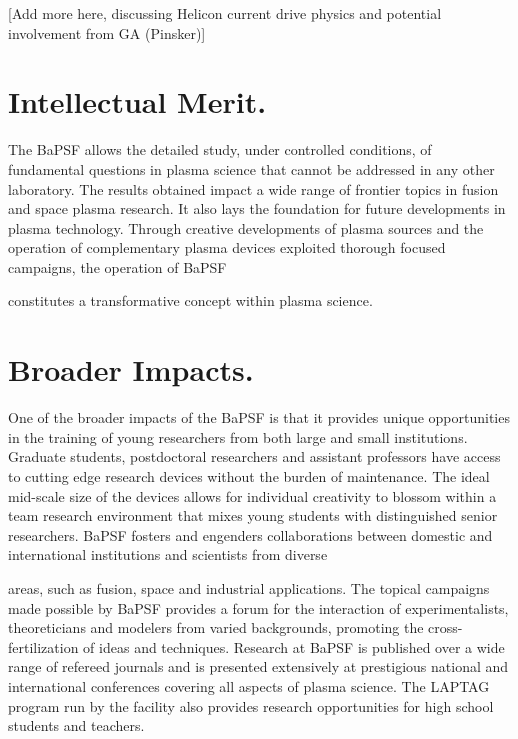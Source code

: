 \documentclass[11pt]{article}
\begin{document}
{[}Add more here, discussing Helicon current drive physics and potential
involvement from GA (Pinsker){]}


\section{Intellectual Merit.}

The BaPSF allows the detailed study, under controlled conditions, of
fundamental questions in plasma science that cannot be addressed in any
other laboratory. The results obtained impact a wide range of frontier
topics in fusion and space plasma research. It also lays the foundation
for future developments in plasma technology. Through creative
developments of plasma sources and the operation of complementary plasma
devices exploited thorough focused campaigns, the operation of BaPSF

constitutes a transformative concept within plasma science.

\section{Broader Impacts.}

One of the broader impacts of the BaPSF is that it provides unique
opportunities in the training of young researchers from both large and
small institutions. Graduate students, postdoctoral researchers and
assistant professors have access to cutting edge research devices
without the burden of maintenance. The ideal mid-scale size of the
devices allows for individual creativity to blossom within a team
research environment that mixes young students with distinguished senior
researchers. BaPSF fosters and engenders collaborations between domestic
and international institutions and scientists from diverse

areas, such as fusion, space and industrial applications. The topical
campaigns made possible by BaPSF provides a forum for the interaction of
experimentalists, theoreticians and modelers from varied backgrounds,
promoting the cross-fertilization of ideas and techniques. Research at
BaPSF is published over a wide range of refereed journals and is
presented extensively at prestigious national and international
conferences covering all aspects of plasma science. The LAPTAG program
run by the facility also provides research opportunities for high school
students and teachers.


\newpage

\setcounter{page}{1}

%
%

  
\end{document}
